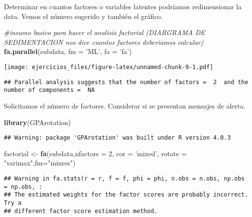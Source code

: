 \documentclass[
]{article}
\newenvironment{Shaded}{\begin{snugshade}}{\end{snugshade}}
\newcommand{\CommentTok}[1]{\textcolor[rgb]{0.56,0.35,0.01}{\textit{#1}}}
\newcommand{\DataTypeTok}[1]{\textcolor[rgb]{0.13,0.29,0.53}{#1}}
\newcommand{\DecValTok}[1]{\textcolor[rgb]{0.00,0.00,0.81}{#1}}
\newcommand{\KeywordTok}[1]{\textcolor[rgb]{0.13,0.29,0.53}{\textbf{#1}}}
\newcommand{\NormalTok}[1]{#1}
\newcommand{\StringTok}[1]{\textcolor[rgb]{0.31,0.60,0.02}{#1}}
\begin{document}
Determinar en cuantos factores o variables latentes podríamos
redimensionar la data. Vemos el número sugerido y también el gráfico.

\begin{Shaded}
\begin{Highlighting}[]
\CommentTok{#insumo basico para hacer el analisis factorial (DIARGRAMA DE SEDIMENTACION nos dice cuantos factores deberiamos calcular)}
\KeywordTok{fa.parallel}\NormalTok{(subdata, }\DataTypeTok{fm =} \StringTok{'ML'}\NormalTok{, }\DataTypeTok{fa =} \StringTok{'fa'}\NormalTok{)}
\end{Highlighting}
\end{Shaded}

\texttt{[image: ejercicios\_files/figure-latex/unnamed-chunk-9-1.pdf]}

\begin{verbatim}
## Parallel analysis suggests that the number of factors =  2  and the number of components =  NA
\end{verbatim}

Solicitamos el número de factores. Considerar si se presentan mensajes
de alerta.

\begin{Shaded}
\begin{Highlighting}[]
\KeywordTok{library}\NormalTok{(GPArotation)}
\end{Highlighting}
\end{Shaded}

\begin{verbatim}
## Warning: package 'GPArotation' was built under R version 4.0.3
\end{verbatim}

\begin{Shaded}
\begin{Highlighting}[]
\NormalTok{factorial <-}\StringTok{ }\KeywordTok{fa}\NormalTok{(subdata,}\DataTypeTok{nfactors =} \DecValTok{2}\NormalTok{, }\DataTypeTok{cor =} \StringTok{'mixed'}\NormalTok{, }\DataTypeTok{rotate =} \StringTok{"varimax"}\NormalTok{,}\DataTypeTok{fm=}\StringTok{"minres"}\NormalTok{)}
\end{Highlighting}
\end{Shaded}

\begin{verbatim}
## Warning in fa.stats(r = r, f = f, phi = phi, n.obs = n.obs, np.obs = np.obs, :
## The estimated weights for the factor scores are probably incorrect. Try a
## different factor score estimation method.
\end{verbatim}
\end{document}
